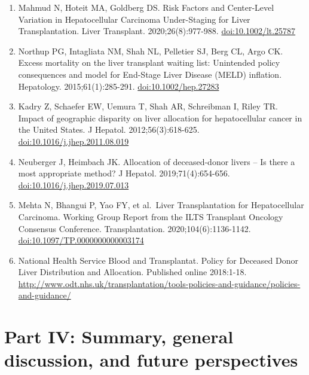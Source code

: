 \documentclass[11pt,english,]{book} %
\begin{document}
\begin{enumerate}
\item
  Mahmud N, Hoteit MA, Goldberg DS. Risk Factors and Center-Level Variation in Hepatocellular Carcinoma Under-Staging for Liver Transplantation. Liver Transplant. 2020;26(8):977-988. \url{doi:10.1002/lt.25787}
\item
  Northup PG, Intagliata NM, Shah NL, Pelletier SJ, Berg CL, Argo CK. Excess mortality on the liver transplant waiting list: Unintended policy consequences and model for End-Stage Liver Disease (MELD) inflation. Hepatology. 2015;61(1):285-291. \url{doi:10.1002/hep.27283}
\item
  Kadry Z, Schaefer EW, Uemura T, Shah AR, Schreibman I, Riley TR. Impact of geographic disparity on liver allocation for hepatocellular cancer in the United States. J Hepatol. 2012;56(3):618-625. \url{doi:10.1016/j.jhep.2011.08.019}
\item
  Neuberger J, Heimbach JK. Allocation of deceased-donor livers -- Is there a most appropriate method? J Hepatol. 2019;71(4):654-656. \url{doi:10.1016/j.jhep.2019.07.013}
\item
  Mehta N, Bhangui P, Yao FY, et al.~Liver Transplantation for Hepatocellular Carcinoma. Working Group Report from the ILTS Transplant Oncology Consensus Conference. Transplantation. 2020;104(6):1136-1142. \url{doi:10.1097/TP.0000000000003174}
\item
  National Health Service Blood and Transplantat. Policy for Deceased Donor Liver Distribution and Allocation. Published online 2018:1-18. \url{http://www.odt.nhs.uk/transplantation/tools-policies-and-guidance/policies-and-guidance/}
\end{enumerate}

\newpage
\linespread{1.213}
\normalsize
\thispagestyle{plain}

\mbox{}

\pagecolor{black}
\color{white}

\hypertarget{part-iv-summary-general-discussion-and-future-perspectives}{%
\chapter*{Part IV: Summary, general discussion, and future perspectives}\label{part-iv-summary-general-discussion-and-future-perspectives}}


\end{document}
